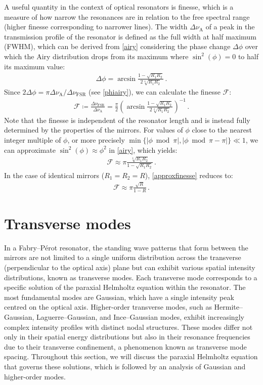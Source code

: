\documentclass[../Thesis-IJspeert.tex]{subfiles}
\begin{document}
A useful quantity in the context of optical resonators is finesse, which is a measure of how narrow the resonances are in relation to the free spectral range (higher finesse corresponding to narrower lines). The width $\Delta \nu_\mathrm{A}$ of a peak in the transmission profile of the resonator is defined as the full width at half maximum (FWHM), which can be derived from \autoref{airy} considering the phase change $\Delta \phi$ over which the Airy distribution drops from its maximum where $\sin^2(\phi)=0$ to half its maximum value:
\begin{align}
	\Delta\phi=\arcsin{\frac{1-\sqrt{R_1R_2}}{2\sqrt[4]{R_1R_2}}}\,.
\end{align}
Since $2\Delta\phi={\pi\Delta\nu_\mathrm{A}}/{\Delta\nu_\mathrm{FSR}}$ (see \autoref{phiairy}), we can calculate the finesse $\mathcal{F}$:
\begin{align}
	\mathcal{F}\coloneqq\frac{\Delta\nu_\mathrm{FSR}}{\Delta\nu_\mathrm{A}}=\frac{\pi}{2}\left(\arcsin{\frac{1-\sqrt{R_1R_2}}{2\sqrt[4]{R_1R_2}}}\right)^{-1}\,.
\end{align}
Note that the finesse is independent of the resonator length and is instead fully determined by the properties of the mirrors. For values of $\phi$ close to the nearest integer multiple of $\phi$, or more precisely $\min\{\lvert \phi \bmod \pi \rvert, \lvert \phi \bmod \pi - \pi\rvert\} \ll 1$, we can approximate $\sin^2(\phi)\approx\phi^2$ in \autoref{airy}, which yields:
\begin{align}
	\label{approxfinesse}
	\mathcal{F}\approx \pi \frac{\sqrt[4]{R_1R_2}}{1-\sqrt{R_1R_2}}\,.
\end{align}
In the case of identical mirrors ($R_1=R_2=R$), \autoref{approxfinesse} reduces to:
\begin{align}
\mathcal{F}\approx \pi\frac{\sqrt{R}}{1-R}\,.
\end{align}

\section{Transverse modes}
\label{sec:transversemodes}
In a Fabry--Pérot resonator, the standing wave patterns that form between the mirrors are not limited to a single uniform distribution across the transverse (perpendicular to the optical axis) plane but can exhibit various spatial intensity distributions, known as transverse modes. Each transverse mode corresponds to a specific solution of the paraxial Helmholtz equation within the resonator. The most fundamental modes are Gaussian, which have a single intensity peak centred on the optical axis. Higher-order transverse modes, such as Hermite--Gaussian, Laguerre--Gaussian, and Ince--Gaussian modes, exhibit increasingly complex intensity profiles with distinct nodal structures. These modes differ not only in their spatial energy distributions but also in their resonance frequencies due to their transverse confinement, a phenomenon known as transverse mode spacing. Throughout this section, we will discuss the paraxial Helmholtz equation that governs these solutions, which is followed by an analysis of Gaussian and higher-order modes.
\end{document}
